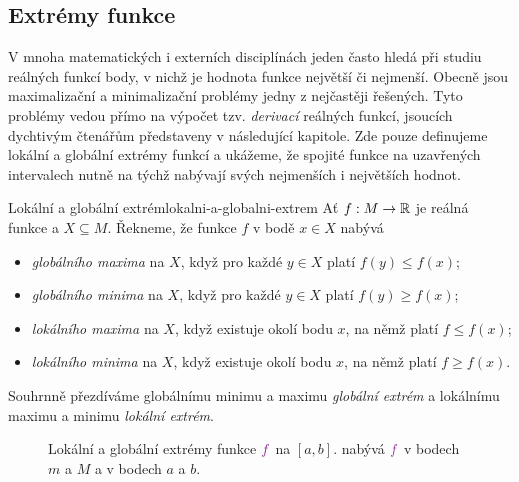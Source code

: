 \subsection{Extrémy funkce}
\label{ssec:extremy-funkce}

V mnoha matematických i externích disciplínách jeden často hledá při studiu
reálných funkcí body, v nichž je hodnota funkce největší či nejmenší. Obecně
jsou maximalizační a minimalizační problémy jedny z nejčastěji řešených. Tyto
problémy vedou přímo na výpočet tzv. \emph{derivací} reálných funkcí, jsoucích
dychtivým čtenářům představeny v následující kapitole. Zde pouze definujeme
lokální a globální extrémy funkcí a ukážeme, že spojité funkce na uzavřených
intervalech nutně na týchž nabývají svých nejmenších i největších hodnot.

\begin{definition}{Lokální a globální extrém}{lokalni-a-globalni-extrem}
 Ať $f:M \to \mathbb{R}$ je reálná funkce a $X \subseteq M$. Řekneme, že funkce $f$ v
 bodě $x \in X$ nabývá
 \begin{itemize}
  \item \emph{globálního maxima} na $X$, když pro každé $y \in X$ platí
   $f(y) \leq f(x)$;
  \item \emph{globálního minima} na $X$, když pro každé $y \in X$ platí $f(y)
   \geq f(x)$;
  \item \emph{lokálního maxima} na $X$, když existuje okolí bodu $x$, na němž
   platí $f \leq f(x)$;
  \item \emph{lokálního minima} na $X$, když existuje okolí bodu $x$, na němž
   platí $f \geq f(x)$.
 \end{itemize}
 Souhrnně přezdíváme globálnímu minimu a maximu \emph{globální extrém} a
 lokálnímu maximu a minimu \emph{lokální extrém}.
\end{definition}

\begin{figure}[ht]
 \centering
 \caption{Lokální a globální extrémy funkce $\clm{f}$ na $[a,b]$.  nabývá $\clm{f}$ v bodech $m$ a $M$ a  v
  bodech $a$ a $b$.}
 \label{fig:extremy}
\end{figure}

